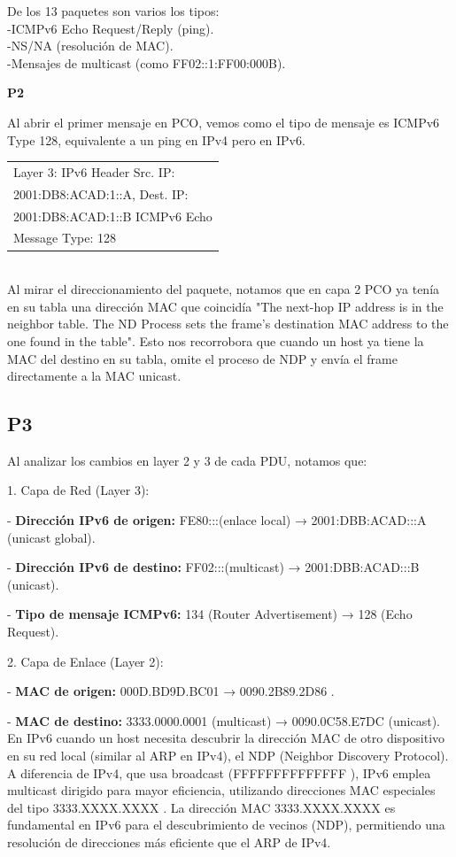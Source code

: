\documentclass{article}
\begin{document}
De los 13 paquetes son varios los tipos:\\
-ICMPv6 Echo Request/Reply (ping).\\
-NS/NA (resolución de MAC).\\
-Mensajes de multicast (como FF02::1:FF00:000B).

\textbf{P2}

Al abrir el primer mensaje en PCO, vemos como el tipo de mensaje es ICMPv6 Type 128, equivalente a un ping en IPv4 pero en IPv6.

\begin{tabular}{|l|}
\hline
Layer 3: IPv6 Header Src. IP:\\
 2001:DB8:ACAD:1::A, Dest. IP: \\
2001:DB8:ACAD:1::B ICMPv6 Echo\\
Message Type: 128 \\
\hline
\end{tabular}
\\

Al mirar el direccionamiento del paquete, notamos que en capa 2 PCO ya tenía en su tabla una dirección MAC que coincidía "The next-hop IP address is in the neighbor table. The ND Process sets the frame's destination MAC address to the one found in the table". Esto nos recorrobora que cuando un host ya tiene la MAC del destino en su tabla, omite el proceso de NDP y envía el frame directamente a la MAC unicast.

\subsection*{P3}
Al analizar los cambios en layer 2 y 3 de cada PDU, notamos que:

1. Capa de Red (Layer 3):

- \textbf{Dirección IPv6 de origen:} FE80:::(enlace local)
   → 2001:DBB:ACAD:::A (unicast global).

- \textbf{Dirección IPv6 de destino:} FF02:::(multicast)
   → 2001:DBB:ACAD:::B (unicast).

- \textbf{Tipo de mensaje ICMPv6:} 134 (Router Advertisement) → 128 (Echo Request).

2. Capa de Enlace (Layer 2):

- \textbf{MAC de origen:} 000D.BD9D.BC01 → 0090.2B89.2D86 .

- \textbf{MAC de destino:} 3333.0000.0001 (multicast) → 0090.0C58.E7DC (unicast).\\
En IPv6 cuando un host necesita descubrir la dirección MAC de otro dispositivo en su red local (similar al ARP en IPv4), el NDP (Neighbor Discovery Protocol). A diferencia de IPv4, que usa broadcast (FFFFFFFFFFFFFF ), IPv6 emplea multicast dirigido para mayor eficiencia, utilizando direcciones MAC especiales del tipo 3333.XXXX.XXXX . La dirección MAC 3333.XXXX.XXXX es fundamental en IPv6 para el descubrimiento de vecinos (NDP), permitiendo una resolución de direcciones más eficiente que el ARP de IPv4.
\end{document}
